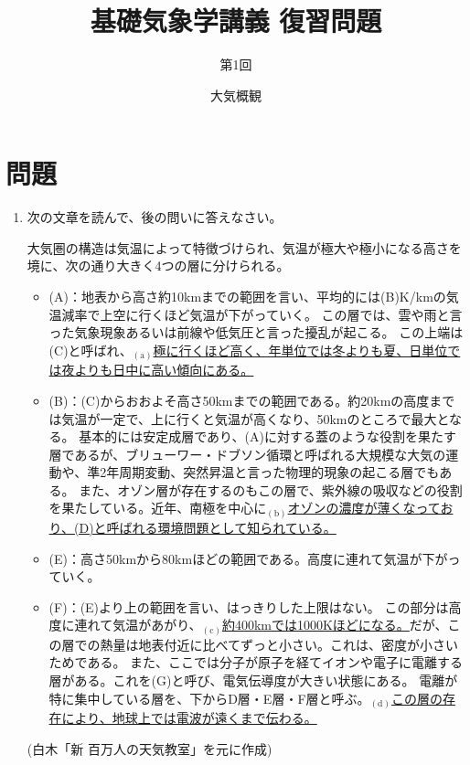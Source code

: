\documentclass{jsarticle}
\newenvironment{problems}
{
  \renewcommand\labelenumi{\doublebox{\arabic{enumi}}}
  \begin{enumerate}
}{
  \end{enumerate}
  \renewcommand\labelenumi{\arabic{enumi}.}
}
\begin{document}
\title{基礎気象学講義 復習問題} %
\author{第1回} %
\date{大気概観} %
\maketitle

\section{問題}

    \begin{problems}
    \item 次の文章を読んで、後の問いに答えなさい。
        \begin{screen}
        大気圏の構造は気温によって特徴づけられ、気温が極大や極小になる高さを境に、次の通り大きく4つの層に分けられる。

            \begin{itemize}
            \item (A)：地表から高さ約10kmまでの範囲を言い、平均的には(B)K/kmの気温減率で上空に行くほど気温が下がっていく。
            この層では、雲や雨と言った気象現象あるいは前線や低気圧と言った擾乱が起こる。
            この上端は(C)と呼ばれ、$_{(\mathrm{a})}$\underline{極に行くほど高く、年単位では冬よりも夏、日単位では夜よりも日中に高い傾向にある。}
            \item (B)：(C)からおおよそ高さ50kmまでの範囲である。約20kmの高度までは気温が一定で、上に行くと気温が高くなり、50kmのところで最大となる。
            基本的には安定成層であり、(A)に対する蓋のような役割を果たす層であるが、ブリューワー・ドブソン循環と呼ばれる大規模な大気の運動や、準2年周期変動、突然昇温と言った物理的現象の起こる層でもある。
            また、オゾン層が存在するのもこの層で、紫外線の吸収などの役割を果たしている。近年、南極を中心に$_{(\mathrm{b})}$\underline{オゾンの濃度が薄くなっており、(D)と呼ばれる環境問題として知られている。}
            \item (E)：高さ50kmから80kmほどの範囲である。高度に連れて気温が下がっていく。
            \item (F)：(E)より上の範囲を言い、はっきりした上限はない。
            この部分は高度に連れて気温があがり、$_{(\mathrm{c})}$\underline{約400kmでは1000Kほどになる。}だが、この層での熱量は地表付近に比べてずっと小さい。これは、密度が小さいためである。
            また、ここでは分子が原子を経てイオンや電子に電離する層がある。これを(G)と呼び、電気伝導度が大きい状態にある。
            電離が特に集中している層を、下からD層・E層・F層と呼ぶ。$_{(\mathrm{d})}$\underline{この層の存在により、地球上では電波が遠くまで伝わる。}
            \end{itemize}
            \begin{flushright}
            (白木「新 百万人の天気教室」を元に作成)
            \end{flushright}
        \end{screen}


\end{problems}
\end{document}
